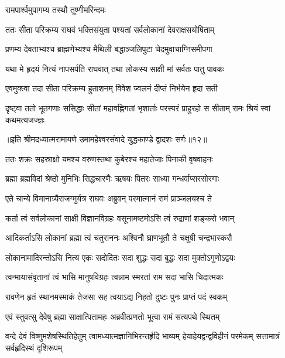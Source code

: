 {रामपार्श्वमुपागम्य तस्थौ तूष्णीमरिन्दमः} %

\twolineshloka
{ततः सीता परिक्रम्य राघवं भक्तिसंयुता} %
{पश्यतां सर्वलोकानां देवराक्षसयोषिताम्}

\twolineshloka
{प्रणम्य देवताभ्यश्च ब्राह्मणेभ्यश्च मैथिली} %
{बद्धाञ्जलिपुटा चेदमुवाचाग्निसमीपगा}

\twolineshloka
{यथा मे हृदयं नित्यं नापसर्पति राघवात्} %
{तथा लोकस्य साक्षी मां सर्वतः पातु पावकः}

\twolineshloka
{एवमुक्त्वा तदा सीता परिक्रम्य हुताशनम्} %
{विवेश ज्वलनं दीप्तं निर्भयेन हृदा सती} %


\fourlineindentedshloka
{दृष्ट्वा ततो भूतगणाः ससिद्धाः}
{सीतां महावह्निगतां भृशार्ताः}
{परस्परं प्राहुरहो स सीताम्}
{रामः श्रियं स्वां कथमत्यजज्ज्ञः} %

{॥इति श्रीमदध्यात्मरामायणे उमामहेश्वरसंवादे युद्धकाण्डे
द्वादशः सर्गः॥१२॥
}





\twolineshloka
{ततः शक्रः सहस्राक्षो यमश्च वरुणस्तथा}
{कुबेरश्च महातेजाः पिनाकी वृषवाहनः} %

\twolineshloka
{ब्रह्मा ब्रह्मविदां श्रेष्ठो मुनिभिः सिद्धचारणैः}
{ऋषयः पितरः साध्या गन्धर्वाप्सरसोरगाः} %

\twolineshloka
{एते चान्ये विमानाग्र्यैराजग्मुर्यत्र राघवः}
{अब्रुवन् परमात्मानं रामं प्राञ्जलयश्च ते} %

\twolineshloka
{कर्ता त्वं सर्वलोकानां साक्षी विज्ञानविग्रहः}
{वसूनामष्टमोऽसि त्वं रुद्राणां शङ्करो भवान्} %

\twolineshloka
{आदिकर्ताऽसि लोकानां ब्रह्मा त्वं चतुराननः}
{अश्विनौ घ्राणभूतौ ते चक्षुषी चन्द्रभास्करौ} %

\twolineshloka
{लोकानामादिरन्तोऽसि नित्य एकः सदोदितः}
{सदा शुद्धः सदा बुद्धः सदा मुक्तोऽगुणोऽद्वयः} %

\twolineshloka
{त्वन्मायासंवृतानां त्वं भासि मानुषविग्रहः}
{त्वन्नाम स्मरतां राम सदा भासि चिदात्मकः} %

\twolineshloka
{रावणेन हृतं स्थानमस्माकं तेजसा सह}
{त्वयाऽद्य निहतो दुष्टः पुनः प्राप्तं पदं स्वकम्} %

\twolineshloka
{एवं स्तुवत्सु देवेषु ब्रह्मा साक्षात्पितामहः}
{अब्रवीत्प्रणतो भूत्वा रामं सत्यपथे स्थितम्} %



\fourlineindentedshloka
{वन्दे देवं विष्णुमशेषस्थितिहेतुम्}
{त्वामध्यात्मज्ञानिभिरन्तर्हृदि भाव्यम्}
{हेयाहेयद्वन्द्वविहीनं परमेकम्}
{सत्तामात्रं सर्वहृदिस्थं दृशिरूपम्} %

